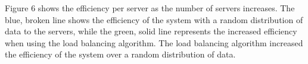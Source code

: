 \documentclass{article}
\newenvironment{Figure}
               {\par\medskip\noindent\minipage{\linewidth}}
               {\endminipage\par\medskip}
\begin{document}
\begin{multicols}{2}
\begin{Figure}
   \centering
\noindent{}
\end{Figure}

Figure 6 shows the efficiency per server as the number of servers increases.  The blue, broken line shows the efficiency of the system with a random distribution of data to the servers, while the green, solid line represents the increased efficiency when using the load balancing algorithm.  The load balancing algorithm increased the efficiency of the system over a random distribution of data.


\end{multicols}
\end{document}
